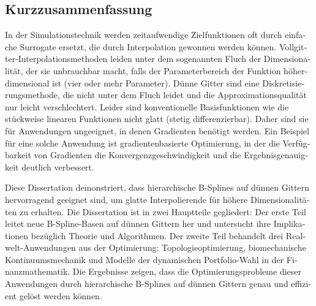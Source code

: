\begin{otherlanguage}{ngerman}
  \section*{Kurzzusammenfassung}
  
  In der Simulationstechnik werden zeitaufwendige Zielfunktionen
  oft durch einfache Surrogate ersetzt, die durch Interpolation
  gewonnen werden können.
  Vollgitter-Interpolationsmethoden leiden unter dem
  sogenannten Fluch der Dimensionalität,
  der sie unbrauchbar macht, falls der Parameterbereich der Funktion
  höherdimensional ist (vier oder mehr Parameter).
  Dünne Gitter sind eine Diskretisierungsmethode, die nicht unter
  dem Fluch leidet und die Approximationsqualität nur leicht verschlechtert.
  Leider sind konventionelle Basisfunktionen wie die stückweise
  linearen Funktionen nicht glatt (stetig differenzierbar).
  Daher sind sie für Anwendungen ungeeignet, in denen Gradienten
  benötigt werden.
  Ein Beispiel für eine solche Anwendung ist gradientenbasierte Optimierung,
  in der die Verfügbarkeit von Gradienten die Konvergenzgeschwindigkeit und
  die Ergebnisgenauigkeit deutlich verbessert.
  
  Diese Dissertation demonstriert, dass hierarchische B-Splines auf
  dünnen Gittern hervorragend geeignet sind,
  um glatte Interpolierende für höhere Dimensionalitäten zu erhalten.
  Die Dissertation ist in zwei Hauptteile gegliedert:
  Der erste Teil leitet neue B-Spline-Basen auf dünnen Gittern her und
  untersucht ihre Implikationen bezüglich Theorie und Algorithmen.
  Der zweite Teil behandelt drei Realwelt-Anwendungen aus der Optimierung:
  Topologieoptimierung, biomechanische Kontinuumsmechanik und
  Modelle der dynamischen Portfolio-Wahl in der Finanzmathematik.
  Die Ergebnisse zeigen, dass die Optimierungsprobleme dieser
  Anwendungen durch hierarchische B-Splines auf dünnen Gittern
  genau und effizient gelöst werden können.
\end{otherlanguage}

\printornamentstrue
\cleardoublepage

